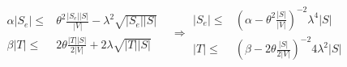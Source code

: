 \begin{equation*}
  \begin{split}
    \begin{matrix}
   \alpha  |S_{e}|  \le &\theta^{2}\frac{|S_{e}||S|}{|V|} - \lambda^{2}\sqrt{ |S_{e}||S| } \\
   \beta |T|   \le  &2\theta \frac{|T||S|}{2|V|} +2 \lambda\sqrt{ |T||S| }  
 \end{matrix}
 & \Rightarrow \begin{matrix}
 |S_{e}|  \le &\left( \alpha -   \theta^{2} \frac{|S|}{|V|} \right)^{-2} \lambda^{4} |S| \\
 |T|  \le &\left( \beta -   2 \theta \frac{|S|}{2|V|} \right)^{-2} 4\lambda^{2} |S|
 \end{matrix}
 \end{split}
\end{equation*}






